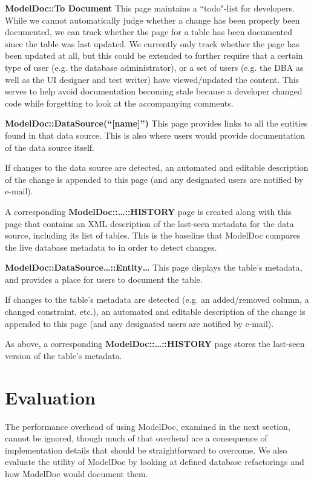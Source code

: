 \documentclass{acm_proc_article-sp}
\begin{document}
\textbf{ModelDoc::To Document}
This page maintains a ``todo"-list for
developers.  While we cannot automatically judge whether a change has been
properly been documented, we can track whether the page for a table has been
documented since the table was last updated.  We currently only track whether
the page has been updated at all, but this could be extended to further require
that a certain type of user (e.g. the database administrator), or a set of
users (e.g. the DBA as well as the UI designer and test writer) have
viewed/updated the content.  This serves to help avoid documentation becoming
stale because a developer changed code while forgetting to look at the
accompanying comments.

\textbf{ModelDoc::DataSource(``[name]'')}
This page provides links to all the entities found in that data source.  This
is also where users would provide documentation of the data source itself.

If changes to the data source are detected, an automated and editable
description of the change is appended to this page (and any designated users
are notified by e-mail).

A corresponding \textbf{ModelDoc::\ldots::HISTORY} page is
created along with this page that contains an XML description of the last-seen
metadata for the data source, including its list of tables.  This is the
baseline that ModelDoc compares the live database metadata to in order to 
detect changes.

\textbf{ModelDoc::DataSource\ldots::Entity\ldots}
This page displays the table's metadata, and provides a place for users to
document the table.

If changes to the table's metadata are detected (e.g. an added/removed column,
a changed constraint, etc.), an automated and editable description of the
change is appended to this page (and any designated users are notified
by e-mail).

As above, a corresponding
\textbf{ModelDoc::\ldots::HISTORY}
page stores the last-seen version of the table's metadata.

\section{Evaluation}

The performance overhead of using ModelDoc, examined in the next section, cannot
be ignored, though much of that overhead are a consequence of implementation
details that should be straightforward to overcome.  We also evaluate the
utility of ModelDoc by looking at defined database refactorings and how
ModelDoc would document them.
\end{document}
